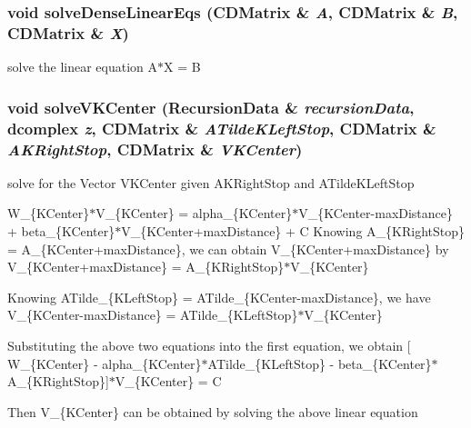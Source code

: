 \subsubsection{\setlength{\rightskip}{0pt plus 5cm}void solve\-Dense\-Linear\-Eqs (\bf{CDMatrix} \& {\em A}, \bf{CDMatrix} \& {\em B}, \bf{CDMatrix} \& {\em X})}\label{recursiveCalculation_8h_f519514f8f6d6155af66d593f73e4e1d}


solve the linear equation A$\ast$X = B 
\subsubsection{\setlength{\rightskip}{0pt plus 5cm}void solve\-VKCenter (\bf{Recursion\-Data} \& {\em recursion\-Data}, \bf{dcomplex} {\em z}, \bf{CDMatrix} \& {\em ATilde\-KLeft\-Stop}, \bf{CDMatrix} \& {\em AKRight\-Stop}, \bf{CDMatrix} \& {\em VKCenter})}\label{recursiveCalculation_8h_e097b7a86f8594f1b00c6f8c99c17a08}


solve for the Vector VKCenter given AKRight\-Stop and ATilde\-KLeft\-Stop

W\_\-\{KCenter\}$\ast$V\_\-\{KCenter\} = alpha\_\-\{KCenter\}$\ast$V\_\-\{KCenter-max\-Distance\} + beta\_\-\{KCenter\}$\ast$V\_\-\{KCenter+max\-Distance\} + C Knowing A\_\-\{KRight\-Stop\} = A\_\-\{KCenter+max\-Distance\}, we can obtain V\_\-\{KCenter+max\-Distance\} by V\_\-\{KCenter+max\-Distance\} = A\_\-\{KRight\-Stop\}$\ast$V\_\-\{KCenter\}

Knowing ATilde\_\-\{KLeft\-Stop\} = ATilde\_\-\{KCenter-max\-Distance\}, we have V\_\-\{KCenter-max\-Distance\} = ATilde\_\-\{KLeft\-Stop\}$\ast$V\_\-\{KCenter\}

Substituting the above two equations into the first equation, we obtain [ W\_\-\{KCenter\} - alpha\_\-\{KCenter\}$\ast$ATilde\_\-\{KLeft\-Stop\} - beta\_\-\{KCenter\}$\ast$A\_\-\{KRight\-Stop\}]$\ast$V\_\-\{KCenter\} = C

Then V\_\-\{KCenter\} can be obtained by solving the above linear equation 